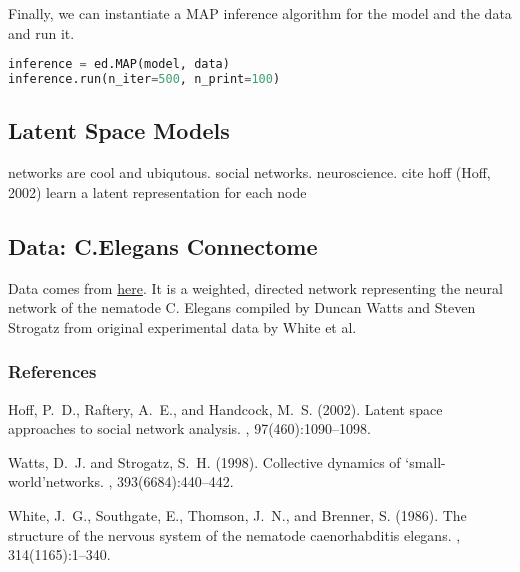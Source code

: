 Finally, we can instantiate a MAP inference algorithm for the model and the data and run it.
\begin{lstlisting}[language=Python]
inference = ed.MAP(model, data)
inference.run(n_iter=500, n_print=100)
\end{lstlisting}

\subsection{Latent Space Models}

networks are cool and ubiqutous. social networks. neuroscience. 
cite hoff (Hoff, 2002)
learn a latent representation for each node

\subsection{Data: C.Elegans Connectome}

Data comes from \href{http://www-personal.umich.edu/~mejn/netdata/}{here}.
It is a weighted, directed network representing the neural network of the nematode C. Elegans compiled by Duncan Watts and Steven Strogatz from original experimental data by White et al.

\subsubsection{References}
\begin{thebibliography}{}
Hoff, P.~D., Raftery, A.~E., and Handcock, M.~S. (2002).
\newblock Latent space approaches to social network analysis.
,
  97(460):1090--1098.

Watts, D.~J. and Strogatz, S.~H. (1998).
\newblock Collective dynamics of ‘small-world’networks.
, 393(6684):440--442.

White, J.~G., Southgate, E., Thomson, J.~N., and Brenner, S. (1986).
\newblock The structure of the nervous system of the nematode caenorhabditis
  elegans.
, 314(1165):1--340.
\end{thebibliography}


